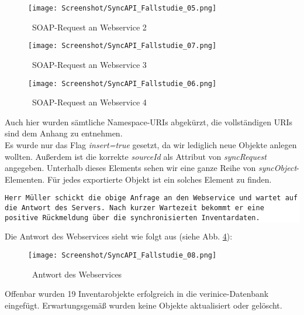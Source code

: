 \documentclass[a4paper,10pt]{book}
\begin{document}
\newline
\begin{figure}[htb!]
  \centering
  \texttt{[image: Screenshot/SyncAPI\_Fallstudie\_05.png]}
  \caption{\label{SOAP-Request an Webservice 2} \ SOAP-Request an Webservice 2}
\end{figure}
\newline
\begin{figure}[htb!]
  \centering
  \texttt{[image: Screenshot/SyncAPI\_Fallstudie\_07.png]}
  \caption{\label{SOAP-Request an Webservice 3} \ SOAP-Request an Webservice 3}
\end{figure}
\newline
\begin{figure}[htb!]
  \centering
  \texttt{[image: Screenshot/SyncAPI\_Fallstudie\_06.png]}
  \caption{\label{SOAP-Request an Webservice 4} \ SOAP-Request an Webservice 4}
\end{figure}
\newline
Auch hier wurden sämtliche Namespace-URIs abgekürzt, die vollständigen URIs sind dem Anhang zu
entnehmen.
\newline\\
Es wurde nur das Flag \textit{insert=true} gesetzt, da wir lediglich neue Objekte anlegen wollten. Außerdem ist die korrekte
\textit{sourceId} als Attribut von \textit{syncRequest} angegeben. Unterhalb dieses Elements sehen wir eine ganze Reihe
von \textit{syncObject}-Elementen. Für jedes exportierte Objekt ist ein solches Element zu finden.
\newline\newline
\colorbox{white}{\parbox{\textwidth}{
{\tt Herr Müller schickt die obige Anfrage an den Webservice und wartet auf die Antwort des Servers. Nach kurzer Wartezeit
bekommt er eine positive Rückmeldung über die synchronisierten Inventardaten.}
}}
\newline\newline
Die Antwort des Webservices sieht wie folgt aus (siehe Abb. \ref{Antwort des Webservices}):
\newline
\begin{figure}[htb!]
  \centering
  \texttt{[image: Screenshot/SyncAPI\_Fallstudie\_08.png]}
  \caption{\label{Antwort des Webservices} \ Antwort des Webservices}
\end{figure}
\newline
Offenbar wurden 19 Inventarobjekte erfolgreich in die verinice-Datenbank eingefügt. Erwartungsgemäß wurden keine Objekte aktualisiert oder gelöscht.
\end{document}
